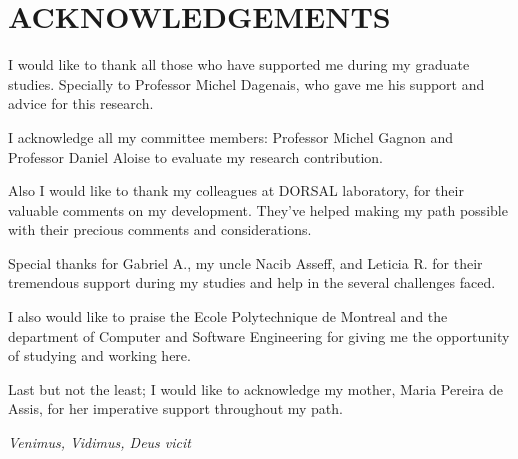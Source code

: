 %
\chapter*{ACKNOWLEDGEMENTS}\thispagestyle{headings}
%
I would like to thank all those who have supported me during my graduate studies. Specially to Professor Michel Dagenais, who gave me his support and advice for this research.
 
I acknowledge all my committee members: Professor Michel Gagnon and Professor Daniel Aloise to evaluate my research contribution.
 
 Also I would like to thank my colleagues at DORSAL laboratory, for their valuable comments on my development. They’ve helped making my path possible with their precious comments and considerations.
 
Special thanks for Gabriel A., my uncle Nacib Asseff, and Leticia R. for their tremendous support during my studies and help in the several challenges faced.
 
I also would like to praise the Ecole Polytechnique de Montreal and the department of Computer and Software Engineering for giving me the opportunity of studying and working here. 
 
 Last but not the least; I would like to acknowledge my mother, Maria Pereira de Assis, for her imperative support throughout my path. 
 
\begin{flushleft}
\textit{Venimus, Vidimus, Deus vicit}
\end{flushleft}
